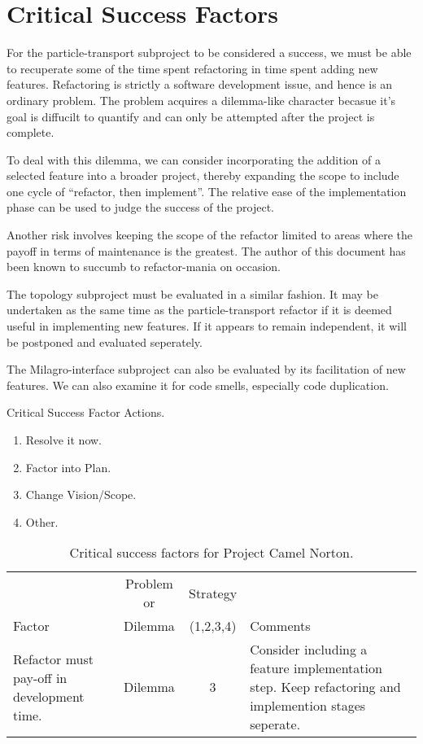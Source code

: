 \documentclass[11pt]{nmemo}
\begin{document}
\newpage
\section*{Critical Success Factors}

For the particle-transport subproject to be considered a success, we
must be able to recuperate some of the time spent refactoring in time
spent adding new features. Refactoring is strictly a software
development issue, and hence is an ordinary problem. The problem
acquires a dilemma-like character becasue it's goal is diffucilt to
quantify and can only be attempted after the project is complete.

To deal with this dilemma, we can consider incorporating the addition
of a selected feature into a broader project, thereby expanding the
scope to include one cycle of ``refactor, then implement''. The
relative ease of the implementation phase can be used to judge the
success of the project.

Another risk involves keeping the scope of the refactor limited to
areas where the payoff in terms of maintenance is the greatest. The
author of this document has been known to succumb to refactor-mania on
occasion. 

The topology subproject must be evaluated in a similar fashion. It may
be undertaken as the same time as the particle-transport refactor if
it is deemed useful in implementing new features. If it appears to
remain independent, it will be postponed and evaluated seperately.

The Milagro-interface subproject can also be evaluated by its
facilitation of new features. We can also examine it for code smells,
especially code duplication.

\begin{table}[ht]
  \caption{Critical Success Factor Actions.}
    \begin{enumerate}
    \item Resolve it now.
    \item Factor into Plan.
    \item Change Vision/Scope.
    \item Other.
    \end{enumerate}
\end{table}

\begin{table}[ht]
  \begin{center}
    \caption{Critical success factors for Project Camel Norton.}
    \label{tab:critical-success}
    \begin{tabular}{|p{4.5cm}|c|c|p{4.5cm}|} 
    \hline
                       & Problem or & Strategy  &          \\
    Factor             &  Dilemma   & (1,2,3,4) & Comments \\ 
    \hline\hline
    Refactor must pay-off in development time.
    & Dilemma & 3 
    & Consider including a feature implementation step. Keep
    refactoring and implemention stages seperate. \\ 
    \hline
    \end{tabular}
  \end{center}
\end{table}
\end{document}
